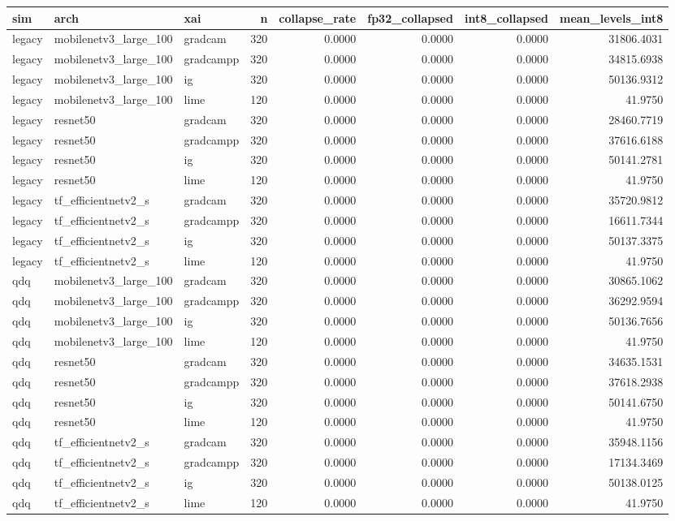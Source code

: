 \begin{tabular}{lllrrrrr}
\toprule
sim & arch & xai & n & collapse\_rate & fp32\_collapsed & int8\_collapsed & mean\_levels\_int8 \\
\midrule
legacy & mobilenetv3\_large\_100 & gradcam & 320 & 0.0000 & 0.0000 & 0.0000 & 31806.4031 \\
legacy & mobilenetv3\_large\_100 & gradcampp & 320 & 0.0000 & 0.0000 & 0.0000 & 34815.6938 \\
legacy & mobilenetv3\_large\_100 & ig & 320 & 0.0000 & 0.0000 & 0.0000 & 50136.9312 \\
legacy & mobilenetv3\_large\_100 & lime & 120 & 0.0000 & 0.0000 & 0.0000 & 41.9750 \\
legacy & resnet50 & gradcam & 320 & 0.0000 & 0.0000 & 0.0000 & 28460.7719 \\
legacy & resnet50 & gradcampp & 320 & 0.0000 & 0.0000 & 0.0000 & 37616.6188 \\
legacy & resnet50 & ig & 320 & 0.0000 & 0.0000 & 0.0000 & 50141.2781 \\
legacy & resnet50 & lime & 120 & 0.0000 & 0.0000 & 0.0000 & 41.9750 \\
legacy & tf\_efficientnetv2\_s & gradcam & 320 & 0.0000 & 0.0000 & 0.0000 & 35720.9812 \\
legacy & tf\_efficientnetv2\_s & gradcampp & 320 & 0.0000 & 0.0000 & 0.0000 & 16611.7344 \\
legacy & tf\_efficientnetv2\_s & ig & 320 & 0.0000 & 0.0000 & 0.0000 & 50137.3375 \\
legacy & tf\_efficientnetv2\_s & lime & 120 & 0.0000 & 0.0000 & 0.0000 & 41.9750 \\
qdq & mobilenetv3\_large\_100 & gradcam & 320 & 0.0000 & 0.0000 & 0.0000 & 30865.1062 \\
qdq & mobilenetv3\_large\_100 & gradcampp & 320 & 0.0000 & 0.0000 & 0.0000 & 36292.9594 \\
qdq & mobilenetv3\_large\_100 & ig & 320 & 0.0000 & 0.0000 & 0.0000 & 50136.7656 \\
qdq & mobilenetv3\_large\_100 & lime & 120 & 0.0000 & 0.0000 & 0.0000 & 41.9750 \\
qdq & resnet50 & gradcam & 320 & 0.0000 & 0.0000 & 0.0000 & 34635.1531 \\
qdq & resnet50 & gradcampp & 320 & 0.0000 & 0.0000 & 0.0000 & 37618.2938 \\
qdq & resnet50 & ig & 320 & 0.0000 & 0.0000 & 0.0000 & 50141.6750 \\
qdq & resnet50 & lime & 120 & 0.0000 & 0.0000 & 0.0000 & 41.9750 \\
qdq & tf\_efficientnetv2\_s & gradcam & 320 & 0.0000 & 0.0000 & 0.0000 & 35948.1156 \\
qdq & tf\_efficientnetv2\_s & gradcampp & 320 & 0.0000 & 0.0000 & 0.0000 & 17134.3469 \\
qdq & tf\_efficientnetv2\_s & ig & 320 & 0.0000 & 0.0000 & 0.0000 & 50138.0125 \\
qdq & tf\_efficientnetv2\_s & lime & 120 & 0.0000 & 0.0000 & 0.0000 & 41.9750 \\
\bottomrule
\end{tabular}
